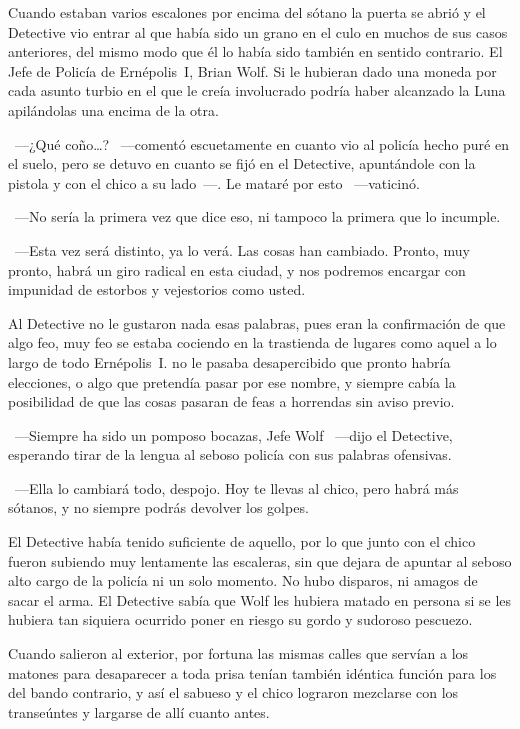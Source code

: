 Cuando estaban varios escalones por encima del sótano la puerta se abrió y el Detective vio entrar al que había sido un grano en el culo en muchos de sus casos anteriores, del mismo modo que él lo había sido también en sentido contrario. El Jefe de Policía de Ernépolis~I, Brian Wolf. Si le hubieran dado una moneda por cada asunto turbio en el que le creía involucrado podría haber alcanzado la Luna apilándolas una encima de la otra.

~---¿Qué coño\dots? ~---comentó escuetamente en cuanto vio al policía hecho puré en el suelo, pero se detuvo en cuanto se fijó en el Detective, apuntándole con la pistola y con el chico a su lado~---. Le mataré por esto ~---vaticinó.

~---No sería la primera vez que dice eso, ni tampoco la primera que lo incumple.

~---Esta vez será distinto, ya lo verá. Las cosas han cambiado. Pronto, muy pronto, habrá un giro radical en esta ciudad, y nos podremos encargar con impunidad de estorbos y vejestorios como usted.

Al Detective no le gustaron nada esas palabras, pues eran la confirmación de que algo feo, muy feo se estaba cociendo en la trastienda de lugares como aquel a lo largo de todo Ernépolis~I. no le pasaba desapercibido que pronto habría elecciones, o algo que pretendía pasar por ese nombre, y siempre cabía la posibilidad de que las cosas pasaran de feas a horrendas sin aviso previo.

~---Siempre ha sido un pomposo bocazas, Jefe Wolf ~---dijo el Detective, esperando tirar de la lengua al seboso policía con sus palabras ofensivas.

~---Ella lo cambiará todo, despojo. Hoy te llevas al chico, pero habrá más sótanos, y no siempre podrás devolver los golpes.

El Detective había tenido suficiente de aquello, por lo que junto con el chico fueron subiendo muy lentamente las escaleras, sin que dejara de apuntar al seboso alto cargo de la policía ni un solo momento. No hubo disparos, ni amagos de sacar el arma. El Detective sabía que Wolf les hubiera matado en persona si se les hubiera tan siquiera ocurrido poner en riesgo su gordo y sudoroso pescuezo.

Cuando salieron al exterior, por fortuna las mismas calles que servían a los matones para desaparecer a toda prisa tenían también idéntica función para los del bando contrario, y así el sabueso y el chico lograron mezclarse con los transeúntes y largarse de allí cuanto antes.

